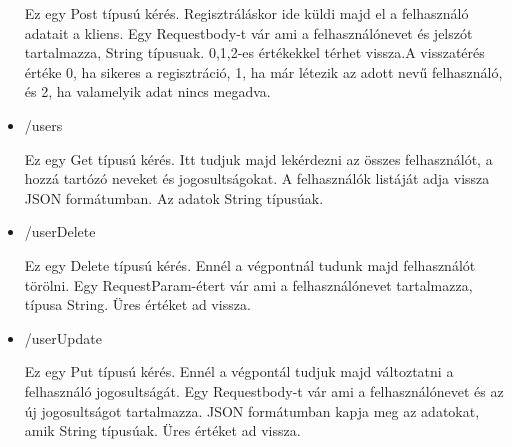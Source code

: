 \begin{itemize}
Ez egy Post típusú kérés. Regisztráláskor ide küldi majd el a felhasználó adatait a kliens.
Egy Requestbody-t vár ami a felhasználónevet és jelszót tartalmazza, String típusuak. 0,1,2-es értékekkel térhet vissza.A visszatérés értéke 0, ha sikeres a regisztráció, 1, ha már létezik az adott nevű felhasználó, és 2, ha valamelyik adat nincs megadva.  
\item /users

Ez egy Get típusú kérés. Itt tudjuk majd lekérdezni az összes felhasználót, a hozzá tartózó neveket és jogosultságokat.
A felhasználók listáját adja vissza JSON formátumban. Az adatok String típusúak.
\item /userDelete

Ez egy Delete típusú kérés. Ennél a végpontnál tudunk majd felhasználót törölni.
Egy RequestParam-étert vár ami a felhasználónevet tartalmazza, típusa String. Üres értéket ad vissza.
\item /userUpdate

Ez egy Put típusú kérés. Ennél  a végpontál tudjuk majd változtatni a felhasználó jogosultságát.
Egy Requestbody-t vár ami a felhasználónevet és az új jogosultságot tartalmazza. JSON formátumban kapja meg az adatokat, amik String típusúak. Üres értéket ad vissza.

\end{itemize}









